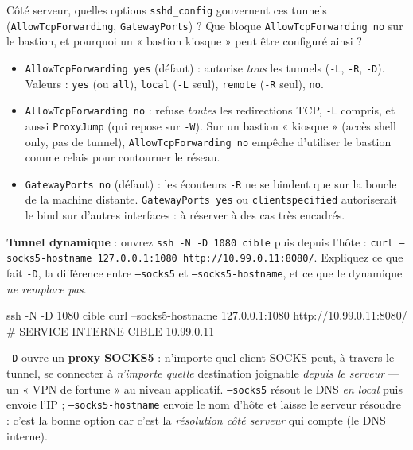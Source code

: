 \documentclass[a4paper,10pt]{exam}
\begin{document}
\begin{questions}
\begin{solution}
\end{solution}
\question Côté serveur, quelles options \texttt{sshd\_config} gouvernent ces tunnels
(\texttt{AllowTcpForwarding}, \texttt{GatewayPorts}) ? Que bloque
\texttt{AllowTcpForwarding no} sur le bastion, et pourquoi un « bastion kiosque » peut
être configuré ainsi ?
\begin{solution}
\begin{itemize}
  \item \texttt{AllowTcpForwarding yes} (défaut) : autorise \emph{tous} les tunnels
        (\texttt{-L}, \texttt{-R}, \texttt{-D}). Valeurs : \texttt{yes} (ou \texttt{all}),
        \texttt{local} (\texttt{-L} seul), \texttt{remote} (\texttt{-R} seul), \texttt{no}.
  \item \texttt{AllowTcpForwarding no} : refuse \emph{toutes} les redirections TCP,
        \texttt{-L} compris, et aussi \texttt{ProxyJump} (qui repose sur \texttt{-W}).
        Sur un bastion « kiosque » (accès shell only, pas de tunnel),
        \texttt{AllowTcpForwarding no} empêche d'utiliser le bastion comme relais pour
        contourner le réseau.
  \item \texttt{GatewayPorts no} (défaut) : les écouteurs \texttt{-R} ne se bindent que sur
        la boucle de la machine distante. \texttt{GatewayPorts yes} ou
        \texttt{clientspecified} autoriserait le bind sur d'autres interfaces : à réserver
        à des cas très encadrés.
\end{itemize}
\end{solution}
\question \textbf{Tunnel dynamique} : ouvrez \texttt{ssh -N -D 1080 cible} puis depuis
l'hôte : \texttt{curl --socks5-hostname 127.0.0.1:1080
http://10.99.0.11:8080/}. Expliquez ce que fait \texttt{-D}, la différence entre
\texttt{--socks5} et \texttt{--socks5-hostname}, et ce que le dynamique \emph{ne remplace
pas}.
\begin{solution}
\begin{bashcode}
ssh -N -D 1080 cible
curl --socks5-hostname 127.0.0.1:1080 http://10.99.0.11:8080/
# SERVICE INTERNE CIBLE 10.99.0.11
\end{bashcode}
\texttt{-D} ouvre un \textbf{proxy SOCKS5} : n'importe quel client SOCKS peut, à travers
le tunnel, se connecter à \emph{n'importe quelle} destination joignable \emph{depuis le
serveur} — un « VPN de fortune » au niveau applicatif.
\texttt{--socks5} résout le DNS \emph{en local} puis envoie l'IP ;
\texttt{--socks5-hostname} envoie le nom d'hôte et laisse le serveur résoudre : c'est la
bonne option car c'est la \emph{résolution côté serveur} qui compte (le DNS interne).

\end{solution}
\end{questions}
\end{document}
